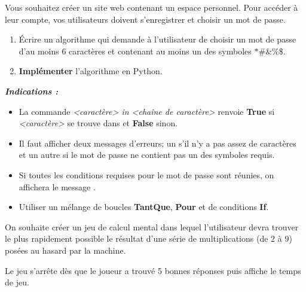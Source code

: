 \begin{boxexstheorieligne}
\eexo
\pagebreak[3]



\exo
Vous souhaitez créer un site web contenant un espace personnel. Pour accéder à leur compte, vos utilisateurs doivent s'enregistrer et choisir un mot de passe.

\smallskip
\begin{enumerate}[label=\alph*),itemsep=1mm,left=0mm]
\item Écrire un algorithme qui demande à l'utilisateur de choisir un mot de passe d'au moins 6 caractères et contenant au moins un des symboles $\ast\#\&\%\$ $.
\item {\bf Implémenter} l'algorithme en Python.
\end{enumerate}

\vspace{3mm}
\textit{\footnotesize\textbf{Indications :}}
\begin{minipage}[t]{0.9\textwidth}\footnotesize\itshape \begin{itemize}[leftmargin=*,itemsep=0mm,labelsep=2mm]

\item La commande {\it <caractère> in <chaîne de caractère>} renvoie {\bf True} si {\it <caractère>} se trouve dans {\it <chaîne de caractères>} et {\bf False} sinon.

\item Il faut afficher deux messages d'erreurs; un s'il n'y a pas assez de caractères et un autre si le mot de passe ne contient pas un des symboles requis.

\item Si toutes les conditions requises pour le mot de passe sont réunies, on affichera le message .

\item Utiliser un mélange de boucles {\bf TantQue}, {\bf Pour} et de conditions {\bf If}.
\end{itemize}
\end{minipage}




\clearpage


\exo
On souhaite créer un jeu de calcul mental dans lequel l'utilisateur devra trouver le plus rapidement possible le résultat d'une série de multiplications (de $2$ à $9$) posées au hasard par la machine.

\smallskip
Le jeu s'arrête dès que le joueur a trouvé 5 bonnes réponses puis affiche le temps de jeu.


\end{boxexstheorieligne}
